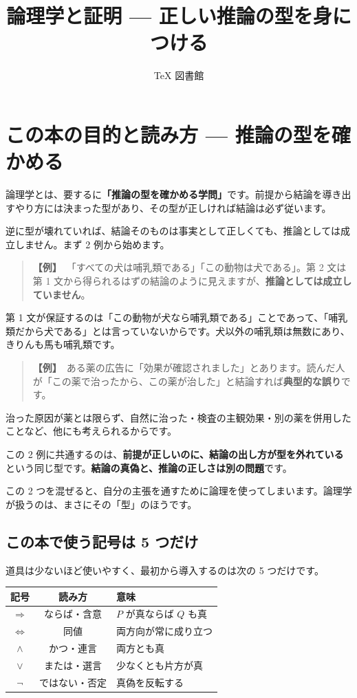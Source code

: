 \documentclass{article}
\title{論理学と証明 — 正しい推論の型を身につける}
\author{TeX 図書館}
\begin{document}
\section{この本の目的と読み方 — 推論の型を確かめる}

論理学とは、要するに\textbf{「推論の型を確かめる学問」}です。前提から結論を導き出すやり方には決まった型があり、その型が正しければ結論は必ず従います。

逆に型が壊れていれば、結論そのものは事実として正しくても、推論としては成立しません。まず 2 例から始めます。

\begin{quote}
\textbf{【例】}\ 「すべての犬は哺乳類である」「この動物は犬である」。第 2 文は第 1 文から得られるはずの結論のように見えますが、\textbf{推論としては成立していません}。
\end{quote}

第 1 文が保証するのは「この動物が犬なら哺乳類である」ことであって、「哺乳類だから犬である」とは言っていないからです。犬以外の哺乳類は無数にあり、きりんも馬も哺乳類です。

\begin{quote}
\textbf{【例】}\ ある薬の広告に「効果が確認されました」とあります。読んだ人が「この薬で治ったから、この薬が治した」と結論すれば\textbf{典型的な誤り}です。
\end{quote}

治った原因が薬とは限らず、自然に治った・検査の主観効果・別の薬を併用したことなど、他にも考えられるからです。

この 2 例に共通するのは、\textbf{前提が正しいのに、結論の出し方が型を外れている}という同じ型です。\textbf{結論の真偽と、推論の正しさは別の問題}です。

この 2 つを混ぜると、自分の主張を通すために論理を使ってしまいます。論理学が扱うのは、まさにその「型」のほうです。

\subsection{この本で使う記号は 5 つだけ}

道具は少ないほど使いやすく、最初から導入するのは次の 5 つだけです。

\begin{center}
\begin{tabular}{|c|c|l|}
\hline
記号 & 読み方 & 意味 \\
\hline
\(\Rightarrow\) & ならば・含意 & \(P\) が真ならば \(Q\) も真 \\
\(\Leftrightarrow\) & 同値 & 両方向が常に成り立つ \\
\(\land\) & かつ・連言 & 両方とも真 \\
\(\lor\) & または・選言 & 少なくとも片方が真 \\
\(\neg\) & ではない・否定 & 真偽を反転する \\
\hline
\end{tabular}
\end{center}
\end{document}
